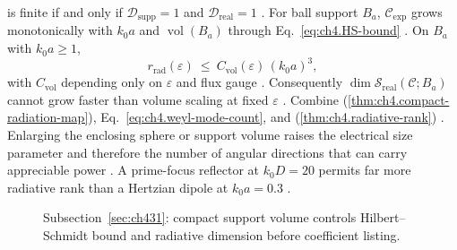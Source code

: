 is finite if and only if \(\mathcal{D}_{\mathrm{supp}}=1\) and \(\mathcal{D}_{\mathrm{real}}=1\)
\cite{stratton1941}. For ball support \(B_{a}\),
\(\mathcal{C}_{\mathrm{exp}}\) grows monotonically with \(k_{0}a\) and \(\operatorname{vol}(B_{a})\) through
Eq.~\eqref{eq:ch4.HS-bound} \cite{jackson1999}.
\label{thm:ch4.support-volume-scaling}
On \(B_{a}\) with \(k_{0}a\ge1\),
\begin{equation}
\label{eq:ch4.support-volume-scaling}
r_{\mathrm{rad}}(\varepsilon)
\ \le\
C_{\mathrm{vol}}(\varepsilon)\,(k_{0}a)^{3},
\end{equation}
with \(C_{\mathrm{vol}}\) depending only on \(\varepsilon\) and flux gauge \cite{stratton1941}.
Consequently \(\dim\mathcal{S}_{\mathrm{real}}(\mathcal{C};B_{a})\) cannot grow faster than volume scaling at fixed
\(\varepsilon\) \cite{harrington2001}.
Combine (\ref{thm:ch4.compact-radiation-map}), Eq.~\eqref{eq:ch4.weyl-mode-count}, and
(\ref{thm:ch4.radiative-rank}) \cite{stratton1941}.
Enlarging the enclosing sphere or support volume raises the electrical size parameter and therefore the number of angular directions that can carry appreciable power \cite{jackson1999}. A prime-focus reflector at $k_0 D=20$ permits far more radiative rank than a Hertzian dipole at $k_0 a=0.3$ \cite{stratton1941}.
\begin{figure}[t]
\centering
{}
\caption{Subsection~\ref{sec:ch431}: compact support volume controls Hilbert--Schmidt bound and radiative dimension before
coefficient listing.}
\label{fig:ch4.support-volume-scaling}
\end{figure}
